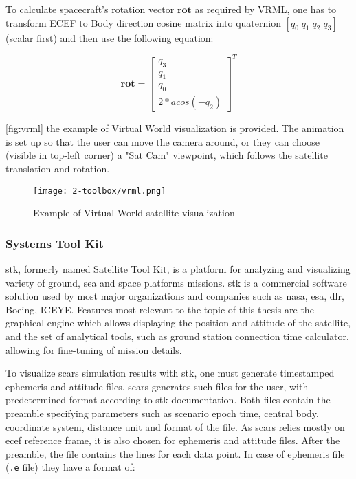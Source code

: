         To calculate spacecraft's rotation vector $\textbf{rot}$ as required by VRML, one has to transform ECEF to Body direction cosine matrix into quaternion $[q_0\; q_1\; q_2\; q_3]$ (scalar first) and then use the following equation:

        \begin{equation}
            \textbf{rot}=
            \begin{bmatrix}
                q_3\\
                q_1\\
                q_0\\
                2*acos(-q_2)
            \end{bmatrix}^T
        \end{equation}

        \autoref{fig:vrml} the example of Virtual World visualization is provided. The animation is set up so that the user can move the camera around, or they can choose (visible in top-left corner) a "Sat Cam" viewpoint, which follows the satellite translation and rotation.

        \begin{figure}[H]
            \centering
            \texttt{[image: 2-toolbox/vrml.png]}
            \caption{Example of Virtual World satellite visualization}
            \label{fig:vrml}
        \end{figure}
        

    \subsubsection{Systems Tool Kit}
        \ac{stk}, formerly named Satellite Tool Kit, is a platform for analyzing and visualizing variety of ground, sea and space platforms missions. \ac{stk} is a commercial software solution used by most major organizations and companies such as \ac{nasa}, \ac{esa}, \ac{dlr}, Boeing, ICEYE. Features most relevant to the topic of this thesis are the graphical engine which allows displaying the position and attitude of the satellite, and the set of analytical tools, such as ground station connection time calculator, allowing for fine-tuning of mission details.

        To visualize \ac{scars} simulation results with \ac{stk}, one must generate timestamped ephemeris and attitude files. \ac{scars} generates such files for the user, with predetermined format according to \ac{stk} documentation\cite{stkephemeris}. Both files contain the preamble specifying parameters such as scenario epoch time, central body, coordinate system, distance unit and format of the file. As \ac{scars} relies mostly on \ac{ecef} reference frame, it is also chosen for ephemeris and attitude files. After the preamble, the file contains the lines for each data point. In case of ephemeris file  (\verb|.e| file) they have a format of:


